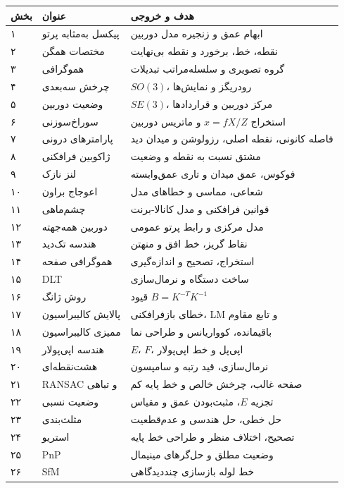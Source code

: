 \documentclass[12pt,openany,oneside]{book}
\begin{document}
\begin{videobox}
\begin{longtable}{p{1.2cm}p{5.1cm}p{8.2cm}}
\toprule
بخش & عنوان & هدف و خروجی\\
\midrule
۱ & پیکسل به‌مثابه پرتو & ابهام عمق و زنجیره مدل دوربین\\
۲ & مختصات همگن & نقطه، خط، برخورد و نقطه بی‌نهایت\\
۳ & هموگرافی & گروه تصویری و سلسله‌مراتب تبدیلات\\
۴ & چرخش سه‌بعدی & \(SO(3)\)، رودریگز و نمایش‌ها\\
۵ & وضعیت دوربین & \(SE(3)\)، مرکز دوربین و قراردادها\\
۶ & سوراخ‌سوزنی & استخراج \(x=fX/Z\) و ماتریس دوربین\\
۷ & پارامترهای درونی & فاصله کانونی، نقطه اصلی، رزولوشن و میدان دید\\
۸ & ژاکوبین فرافکنی & مشتق نسبت به نقطه و وضعیت\\
۹ & لنز نازک & فوکوس، عمق میدان و تاری عمق‌وابسته\\
۱۰ & اعوجاج براون & شعاعی، مماسی و خطاهای مدل\\
۱۱ & چشم‌ماهی & قوانین فرافکنی و مدل کانالا-برنت\\
۱۲ & دوربین همه‌جهته & مدل مرکزی و رابط پرتو عمومی\\
۱۳ & هندسه تک‌دید & نقاط گریز، خط افق و منهتن\\
۱۴ & هموگرافی صفحه & استخراج، تصحیح و اندازه‌گیری\\
۱۵ & DLT & ساخت دستگاه و نرمال‌سازی\\
۱۶ & روش ژانگ & قیود \(B=K^{-T}K^{-1}\)\\
۱۷ & پالایش کالیبراسیون & خطای بازفرافکنی، LM و تابع مقاوم\\
۱۸ & ممیزی کالیبراسیون & باقیمانده، کوواریانس و طراحی نما\\
۱۹ & هندسه اپی‌پولار & \(E\)، \(F\)، اپی‌پل و خط اپی‌پولار\\
۲۰ & هشت‌نقطه‌ای & نرمال‌سازی، قید رتبه و سامپسون\\
۲۱ & RANSAC و تباهی & صفحه غالب، چرخش خالص و خط پایه کم\\
۲۲ & وضعیت نسبی & تجزیه \(E\)، مثبت‌بودن عمق و مقیاس\\
۲۳ & مثلث‌بندی & حل خطی، حل هندسی و عدم‌قطعیت\\
۲۴ & استریو & تصحیح، اختلاف منظر و طراحی خط پایه\\
۲۵ & PnP & وضعیت مطلق و حل‌گرهای مینیمال\\
۲۶ & SfM & خط لوله بازسازی چنددیدگاهی\\

\end{longtable}
\end{videobox}
\end{document}

